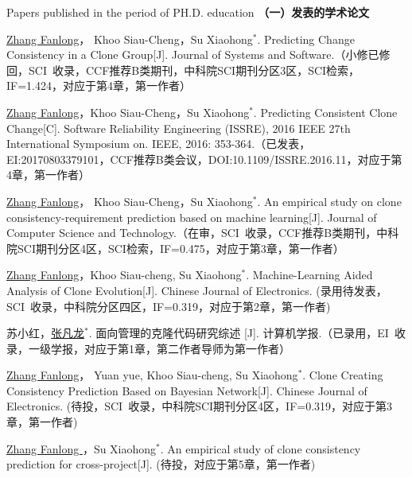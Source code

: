 
 {Papers
published in the period of PH.D. education}
\noindent\textbf{（一）发表的学术论文}
\begin{publist}
\item
\underline{Zhang Fanlong}， Khoo Siau-Cheng，Su Xiaohong{$^*$}. Predicting Change Consistency in a Clone Group[J]. Journal of Systems and Software.（小修已修回，SCI~收录，CCF推荐B类期刊，中科院SCI期刊分区3区，SCI检索，IF=1.424，对应于第4章，第一作者）

\item
\underline{Zhang Fanlong}，Khoo Siau-Cheng，Su Xiaohong{$^*$}. Predicting Consistent Clone Change[C]. Software Reliability Engineering (ISSRE), 2016 IEEE 27th International Symposium on. IEEE, 2016: 353-364.（已发表，EI:20170803379101，CCF推荐B类会议，DOI:10.1109/ISSRE.2016.11，对应于第4章，第一作者）

\item
\underline{Zhang Fanlong}， Khoo Siau-Cheng，Su Xiaohong{$^*$}. An empirical study on clone consistency-requirement prediction based on machine learning[J]. Journal of Computer Science and Technology.（在审，SCI~收录，CCF推荐B类期刊，中科院SCI期刊分区4区，SCI检索，IF=0.475，对应于第3章，第一作者）

\item
\underline{Zhang Fanlong}，Khoo Siau-cheng, Su Xiaohong{$^*$}. Machine-Learning Aided Analysis of Clone Evolution[J]. Chinese Journal of Electronics. (录用待发表，SCI~收录，中科院分区四区，IF=0.319，对应于第2章，第一作者)

\item 
苏小红，\underline{张凡龙}{$^*$}. 面向管理的克隆代码研究综述 [J]. 计算机学报.（已录用，EI~收录，一级学报，对应于第1章，第二作者导师为第一作者）

\item
\underline{Zhang Fanlong}， Yuan yue, Khoo Siau-cheng, Su Xiaohong{$^*$}. Clone Creating Consistency Prediction Based on Bayesian Network[J]. Chinese Journal of Electronics. (待投，SCI~收录，中科院SCI期刊分区4区，IF=0.319，对应于第3章，第一作者)

\item
\underline{Zhang Fanlong }，Su Xiaohong{$^*$}. An empirical study of clone consistency prediction for cross-project[J]. (待投，对应于第5章，第一作者)


\end{publist}
